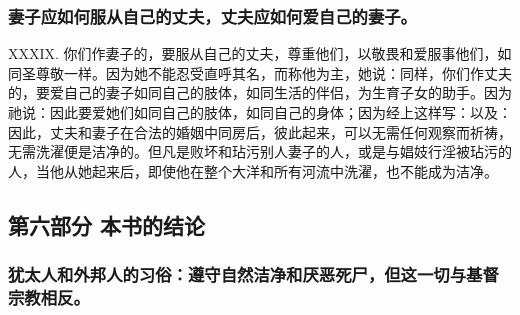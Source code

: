 
\subsubsection{妻子应如何服从自己的丈夫，丈夫应如何爱自己的妻子。}

XXXIX. 你们作妻子的，要服从自己的丈夫，尊重他们，以敬畏和爱服事他们，如同圣尊敬一样。因为她不能忍受直呼其名，而称他为主，她说：同样，你们作丈夫的，要爱自己的妻子如同自己的肢体，如同生活的伴侣，为生育子女的助手。因为祂说：因此要爱她们如同自己的肢体，如同自己的身体；因为经上这样写：以及：因此，丈夫和妻子在合法的婚姻中同房后，彼此起来，可以无需任何观察而祈祷，无需洗濯便是洁净的。但凡是败坏和玷污别人妻子的人，或是与娼妓行淫被玷污的人，当他从她起来后，即使他在整个大洋和所有河流中洗濯，也不能成为洁净。\par


\subsection{第六部分 本书的结论}


\subsubsection{犹太人和外邦人的习俗：遵守自然洁净和厌恶死尸，但这一切与基督宗教相反。}

